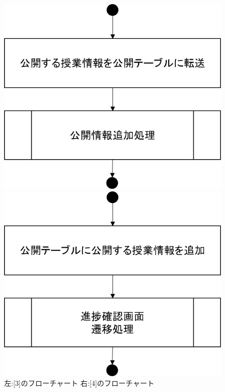 \begin{figure}[htbp]
 \begin{minipage}{0.5\hsize}
  \begin{center}
   \includegraphics[width=0.45\linewidth,clip]{./img/start_lecture/sub3.png}
  \end{center}
 \end{minipage}
 \begin{minipage}{0.5\hsize}
  \begin{center}
   \includegraphics[width=0.45\linewidth,clip]{./img/start_lecture/sub4.png}
  \end{center}
 \end{minipage}
 \caption{左:[3]のフローチャート 右:[4]のフローチャート}\label{fig:startlectureflow1}
\end{figure}

